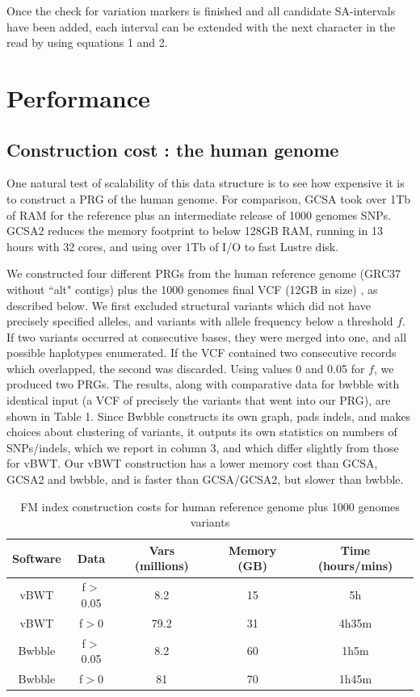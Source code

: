 \documentclass[runningheads,a4paper]{llncs}
\begin{document}
Once the check for variation markers is finished and all candidate SA-intervals have been added, each interval can be extended with the next character in the read by using equations 1 and 2.

\section{Performance}
\subsection{Construction cost : the human genome}
One natural test of scalability of this data structure is to see how expensive it is to construct a PRG of the human genome. For comparison, GCSA took over 1Tb of RAM for the reference plus an intermediate release of 1000 genomes SNPs. GCSA2 reduces the memory footprint to below 128GB RAM, running in 13 hours with 32 cores, and using  over 1Tb of I/O to fast Lustre disk. 

We  constructed four different PRGs from the human reference genome (GRC37 without ``alt" contigs) plus the 1000 genomes final VCF (12GB in size) \cite{1000g}, as described below. We first  excluded structural variants which did not have precisely specified alleles, and variants with allele frequency below a threshold $f$. If two variants occurred at consecutive bases, they were merged into one, and all possible haplotypes enumerated. If the VCF contained two consecutive records which overlapped, the second was discarded. Using values 0 and 0.05 for $f$, we produced two PRGs. The results, along with comparative data for bwbble with identical input (a VCF of precisely the variants that went into our PRG),  are shown in Table 1. Since Bwbble constructs its own graph, pads indels, and makes choices about clustering of variants, it outputs its own statistics on numbers of SNPs/indels, which we report in column 3, and which differ slightly from those for vBWT. Our vBWT construction has a lower  memory cost than GCSA, GCSA2 and bwbble, and is faster than GCSA/GCSA2, but slower than bwbble. 

\begin{table}
\caption{FM index construction costs for human reference genome plus 1000 genomes variants}
\centering
\begin{tabular}{c c c c c}
\hline
Software & Data & Vars (millions) & Memory (GB) & Time (hours/mins)\\
\hline
vBWT & f$>$0.05  & 8.2 &15  & 5h \\
vBWT & f$>$0   & 79.2 & 31 & 4h35m \\
\hline
Bwbble & f$>$0.05 & 8.2 & 60 &  1h5m \\ 
Bwbble & f$>$0 & 81 & 70 & 1h45m\\ 
\hline
\end{tabular}
\end{table}
\end{document}
